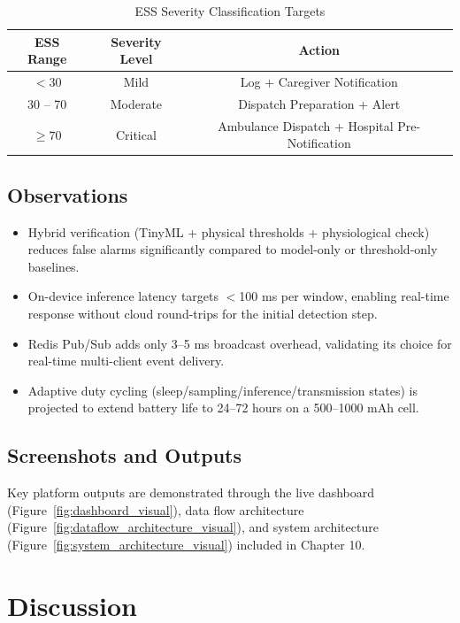 \vspace{1.5em}

\begin{table}[htpb]
\fontsize{10}{12}\selectfont
\caption{ESS Severity Classification Targets}
\label{tab:ess}
\centering
\begin{tabular}{|c|c|c|}
	\hline
	\textbf{ESS Range} & \textbf{Severity Level} & \textbf{Action} \\
	\hline
	$< 30$ & Mild & Log + Caregiver Notification \\
	\hline
	30 -- 70 & Moderate & Dispatch Preparation + Alert \\
	\hline
	$\geq 70$ & Critical & Ambulance Dispatch + Hospital Pre-Notification \\
	\hline
\end{tabular}
\end{table}

\subsection{Observations}

\begin{itemize}
\item Hybrid verification (TinyML + physical thresholds + physiological check) reduces false alarms significantly compared to model-only or threshold-only baselines.
\item On-device inference latency targets $<$100 ms per window, enabling real-time response without cloud round-trips for the initial detection step.
\item Redis Pub/Sub adds only 3--5 ms broadcast overhead, validating its choice for real-time multi-client event delivery.
\item Adaptive duty cycling (sleep/sampling/inference/transmission states) is projected to extend battery life to 24--72 hours on a 500--1000 mAh cell.
\end{itemize}

\subsection{Screenshots and Outputs}

Key platform outputs are demonstrated through the live dashboard (Figure~\ref{fig:dashboard_visual}), data flow architecture (Figure~\ref{fig:dataflow_architecture_visual}), and system architecture (Figure~\ref{fig:system_architecture_visual}) included in Chapter 10.

\section[Discussion]{\textbf{Discussion}}

